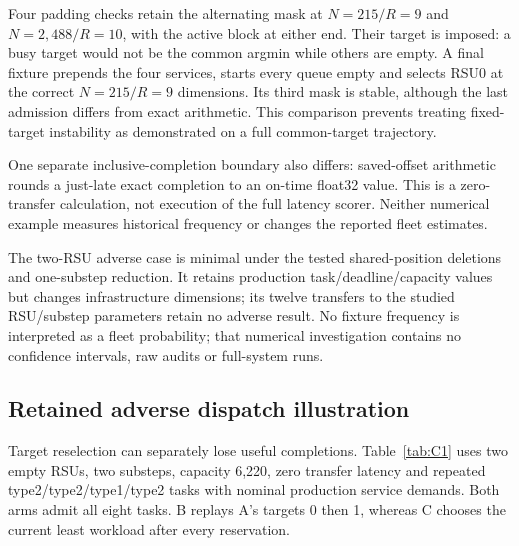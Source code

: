 \documentclass[12pt,a4paper]{article}
\begin{document}
Four padding checks retain the alternating mask at $N=215/R=9$ and $N=2{,}488/R=10$, with the active block at either end. Their target is imposed: a busy target would not be the common argmin while others are empty. A final fixture prepends the four services, starts every queue empty and selects RSU0 at the correct $N=215/R=9$ dimensions. Its third mask is stable, although the last admission differs from exact arithmetic. This comparison prevents treating fixed-target instability as demonstrated on a full common-target trajectory.

One separate inclusive-completion boundary also differs: saved-offset arithmetic rounds a just-late exact completion to an on-time float32 value. This is a zero-transfer calculation, not execution of the full latency scorer. Neither numerical example measures historical frequency or changes the reported fleet estimates.

The two-RSU adverse case is minimal under the tested shared-position deletions and one-substep reduction. It retains production task/deadline/capacity values but changes infrastructure dimensions; its twelve transfers to the studied RSU/substep parameters retain no adverse result. No fixture frequency is interpreted as a fleet probability; that numerical investigation contains no confidence intervals, raw audits or full-system runs.

\FloatBarrier
\subsection{Retained adverse dispatch illustration}\label{sec:C.7}

Target reselection can separately lose useful completions. Table~\ref{tab:C1} uses two empty RSUs, two substeps, capacity 6,220, zero transfer latency and repeated type2/type2/type1/type2 tasks with nominal production service demands. Both arms admit all eight tasks. B replays A's targets 0 then 1, whereas C chooses the current least workload after every reservation.
\end{document}
